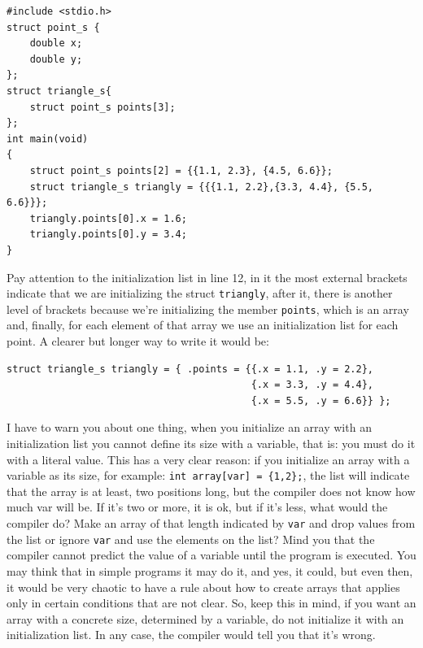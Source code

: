\documentclass[a4paper]{article}
\begin{document}
\noindent
\begin{minipage}[H]{\linewidth}
\mbox{}
\begin{lstlisting}[style=C,
caption={Combinación \textit{struct} con array},
label={lst:exampleArrayStruct}]
#include <stdio.h>
struct point_s {
    double x;
    double y;
};
struct triangle_s{
    struct point_s points[3];
};
int main(void)
{
    struct point_s points[2] = {{1.1, 2.3}, {4.5, 6.6}};
    struct triangle_s triangly = {{{1.1, 2.2},{3.3, 4.4}, {5.5, 6.6}}};
    triangly.points[0].x = 1.6;
    triangly.points[0].y = 3.4;
}
\end{lstlisting}
\end{minipage}

Pay attention to the initialization list in line 12, in it the most external
brackets indicate that we are initializing the struct \texttt{triangly}, after it,
there is another level of brackets because we're initializing the member
\verb"points", which is an array and, finally, for each element of that array
we use an initialization list for each point. A clearer but longer way to write
it would be:

\noindent
\begin{minipage}[H]{\linewidth}
\begin{lstlisting}[style=C]
struct triangle_s triangly = { .points = {{.x = 1.1, .y = 2.2},
                                          {.x = 3.3, .y = 4.4},
                                          {.x = 5.5, .y = 6.6}} };
\end{lstlisting}
\end{minipage}

I have to warn you about one thing, when you initialize an array with an
initialization list you cannot define its size with a variable, that is:
you must do it with a literal value. This has a very clear reason: if you
initialize an array with a variable as its size, for example:
\verb!int array[var] = {1,2};!, the list will indicate that the array is at
least, two positions long, but the compiler does not know how much var will be.
If it's two or more, it is ok, but if it's less, what would the compiler do?
Make an array of that length indicated by \verb"var" and drop values from the
list or ignore \verb!var! and use the elements on the list? Mind you that
the compiler cannot predict the value of a variable until the program is
executed. You may think that in simple programs it may do it, and yes, it could,
but even then, it would be very chaotic to have a rule about how to create
arrays that applies only in certain conditions that are not clear. So, keep this
in mind, if you want an array with a concrete size, determined by a variable,
do not initialize it with an initialization list. In any case, the compiler
would tell you that it's wrong.
\end{document}
